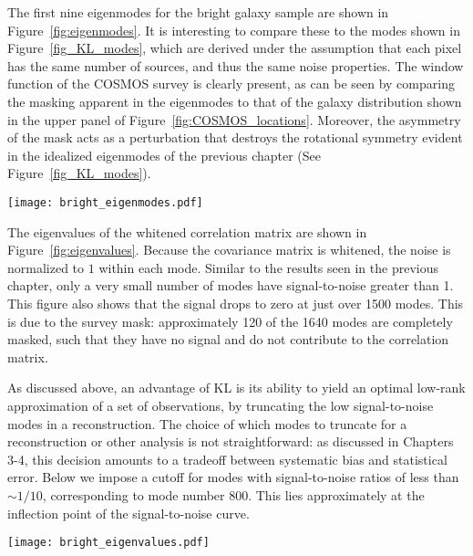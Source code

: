The first nine eigenmodes for the bright galaxy sample
are shown in Figure~\ref{fig:eigenmodes}.
It is interesting to compare these to the modes shown in
Figure~\ref{fig_KL_modes}, which are derived under the assumption that
each pixel has the same number of sources, and thus the same noise properties.
The window function of the COSMOS survey is clearly present, as can be
seen by comparing the
masking apparent in the eigenmodes to that of the galaxy distribution
shown in the upper panel of Figure~\ref{fig:COSMOS_locations}.
Moreover, the asymmetry of the mask acts as a perturbation that destroys
the rotational symmetry evident in the idealized eigenmodes of
the previous chapter (See Figure~\ref{fig_KL_modes}).

\begin{figure*}
 \centering
 \texttt{[image: bright\_eigenmodes.pdf]}
 \caption{
   The first nine 2D KL signal-to-noise eigenmodes
   for the COSMOS bright objects.  This uses square pixels that are
   two arcminutes on a side, leading to $41 \times 40 = 1640$ pixels
   over the entire field.  Compare these results to the KL modes shown
   in Figure~\ref{fig_KL_modes}.}
   \label{fig:eigenmodes}
\end{figure*}

The eigenvalues of the whitened correlation matrix are shown in
Figure~\ref{fig:eigenvalues}.  Because the covariance matrix is
whitened, the noise is normalized to $1$ within each mode.
Similar to the results seen in the previous chapter, only a very small
number of modes have signal-to-noise greater than 1.
This figure also shows that the signal drops to zero at just over 1500
modes.  This is due to the survey mask: approximately 120 of the 1640
modes are completely masked, such that they have no signal and do not
contribute to the correlation matrix.

As discussed above, an advantage of KL is its ability to yield an optimal
low-rank approximation of a set of observations, by truncating the low
signal-to-noise modes in a reconstruction.  The choice of which modes to
truncate for a reconstruction or other analysis is not straightforward:
as discussed in Chapters 3-4, this decision amounts to a tradeoff between
systematic bias and statistical error.  Below we impose a cutoff for
modes with signal-to-noise ratios of less than $\sim 1/10$, corresponding to
mode number 800.  This lies approximately at the inflection point of the
signal-to-noise curve.

\begin{figure*}
 \centering
 \texttt{[image: bright\_eigenvalues.pdf]}
 \caption{
   The distribution of KL eigenvalues for the eigenmodes shown
   in Figure~\ref{fig:eigenmodes}.  There are $41 \times 40 = 1640$
   pixels, but approximately 90 of these contain no sources and are part of
   the mask.  This is reflected in the fact that the final 90 KL modes have
   zero eigenvalue.}
   \label{fig:eigenvalues}
\end{figure*}


